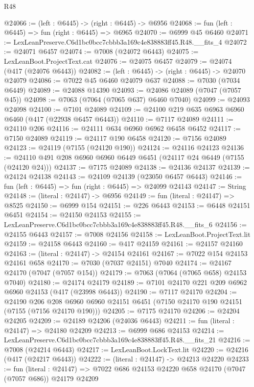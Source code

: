 \begin{lexlean}{R48}
\begin{coremodule}
@24066 := (left : @6445) -> (right : @6445) -> @6956
@24068 := fun (left : @6445) => fun (right : @6445) => @6965
@24070 := @6999 @45 @6460
@24071 := LexLeanPreserve.C6d1bc0bcc7cbbb3a169c4e838883ff45.R48.__fits_4
@24072 := @24071 @6457
@24074 := @7008 (@24072 @6443)
@24075 := LexLeanBoot.ProjectText.cat
@24076 := @24075 @6457
@24079 := @24074 (@417 (@24076 @6443))
@24082 := (left : @6445) -> (right : @6445) -> @24070 @24079
@24086 := @7022 @45 @6460 @24079 @637
@24088 := @7030 (@7034 @6449)
@24089 := @24088 @14390
@24093 := @24086 @24089 (@7047 (@7057 @45))
@24098 := @7063 (@7064 (@7065 @637) @6460 @7040)
@24099 := @24093 @24098
@24100 := @7101 @24089
@24109 := @24100 @219 @635 @6963 @6960 @6460 (@417 (@22938 @6457 @6443))
@24110 := @7117 @24089
@24111 := @24110 @206
@24116 := @24111 @634 @6960 @6962 @6458 @6452
@24117 := @7150 @24089
@24119 := @24117 @190 @6458
@24120 := @7156 @24089
@24123 := @24119 (@7155 (@24120 @190))
@24124 := @24116 @24123
@24136 := @24110 @491 @208 @6960 @6960 @6449 @6451 (@24117 @24 @6449 (@7155 (@24120 @24)))
@24137 := @7175 @24089
@24138 := @24136 @24137
@24139 := @24124 @24138
@24143 := @24109 @24139 (@23050 @6457 @6443)
@24146 := fun (left : @6445) => fun (right : @6445) => @24099 @24143
@24147 := String
@24148 := (literal : @24147) -> @6956
@24149 := fun (literal : @24147) => @8525
@24150 := @6999 @154
@24151 := @226 @6443
@24153 := @6448 @24151 @6451
@24154 := @24150 @24153
@24155 := LexLeanPreserve.C6d1bc0bcc7cbbb3a169c4e838883ff45.R48.__fits_6
@24156 := @24155 @6443
@24157 := @7008 @24156
@24158 := LexLeanBoot.ProjectText.lit
@24159 := @24158 @6443
@24160 := @417 @24159
@24161 := @24157 @24160
@24163 := (literal : @24147) -> @24154 @24161
@24167 := @7022 @154 @24153 @24161 @658
@24170 := @7030 (@7037 @24151) @7040
@24174 := @24167 @24170 (@7047 (@7057 @154))
@24179 := @7063 (@7064 (@7065 @658) @24153 @7040)
@24180 := @24174 @24179
@24189 := @7101 @24170 @221 @209 @6962 @6960 @24153 (@417 (@23998 @6443))
@24190 := @7117 @24170
@24204 := @24190
    @206
    @208
    @6960
    @6960
    @24151
    @6451
    (@7150 @24170 @190 @24151 (@7155 (@7156 @24170 @190)))
@24205 := @7175 @24170
@24206 := @24204 @24205
@24209 := @24189 @24206 (@24036 @6443)
@24211 := fun (literal : @24147) => @24180 @24209
@24213 := @6999 @686 @24153
@24214 := LexLeanPreserve.C6d1bc0bcc7cbbb3a169c4e838883ff45.R48.__fits_21
@24216 := @7008 (@24214 @6443)
@24217 := LexLeanBoot.LockText.lit
@24220 := @24216 (@417 (@24217 @6443))
@24222 := (literal : @24147) -> @24213 @24220
@24233 := fun (literal : @24147) =>
  @7022 @686 @24153 @24220 @658 @24170 (@7047 (@7057 @686)) @24179 @24209

\end{coremodule}
\end{lexlean}
